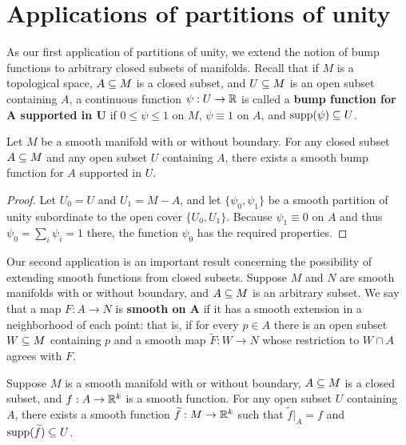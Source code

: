 \section{Applications of partitions of unity}
As our first application of partitions of unity, we extend the notion of bump functions to arbitrary closed subsets of manifolds. Recall that if $M$ is a topological space, $A\subseteq M$ is a closed subset, and $U\subseteq M$ is an open subset containing $A$, a continuous function $\psi:U\to\mathbb{R}$ is called a \textbf{bump function for $\bm{A}$ supported in $\bm{U}$} if $0\leq\psi\leq 1$ on $M$, $\psi\equiv1$ on $A$, and $\mathrm{supp}(\psi)\subseteq U$.
\begin{proposition}
Let $M$ be a smooth manifold with or without boundary. For any closed subset $A\subseteq M$ and any open subset $U$ containing $A$, there exists a smooth bump function for $A$ supported in $U$.
\end{proposition}
\begin{proof}
Let $U_0=U$ and $U_1=M-A$, and let $\{\psi_0,\psi_1\}$ be a smooth partition of unity subordinate to the open cover $\{U_0,U_1\}$. Because $\psi_1\equiv0$ on $A$ and thus $\psi_0=\sum_i\psi_i=1$ there, the function $\psi_0$ has the required properties.
\end{proof}
Our second application is an important result concerning the possibility of extending smooth functions from closed subsets. Suppose $M$ and $N$ are smooth manifolds with or without boundary, and $A\subseteq M$ is an arbitrary subset. We say that a map $F:A\to N$ is \textbf{smooth on $\bm{A}$} if it has a smooth extension in a neighborhood of each point: that is, if for every $p\in A$ there is an open subset $W\subseteq M$ containing $p$ and a smooth map $\widetilde{F}:W\to N$ whose restriction to $W\cap A$ agrees with $F$.
\begin{lemma}\label{ext lem smooth func}
Suppose $M$ is a smooth manifold with or without boundary, $A\subseteq M$ is a closed subset, and $f:A\to\mathbb{R}^k$ is a smooth function. For any open subset $U$ containing $A$, there exists a smooth function $\widetilde{f}:M\to\mathbb{R}^k$ such that $\widetilde{f}|_A=f$ and $\mathrm{supp}(\widetilde{f})\subseteq U$.
\end{lemma}
